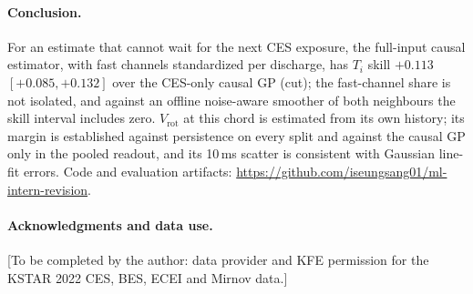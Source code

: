 \documentclass[10pt,twocolumn,letterpaper]{article}
\newcommand{\Ti}{\ensuremath{T_i}}
\newcommand{\Vrot}{\ensuremath{V_\mathrm{rot}}}
\begin{document}
\paragraph{Conclusion.} For an estimate that cannot wait for the next CES exposure, the
full-input causal estimator, with fast channels standardized per discharge, has \Ti{} skill
$+0.113$ $[+0.085, +0.132]$ over the CES-only causal GP (cut); the fast-channel share is not isolated, and against an
offline noise-aware smoother of both neighbours the skill interval includes zero.
\Vrot{} at this chord is estimated from its own history; its margin is established
against persistence on every split and against the causal GP only in the pooled
readout, and its 10\,ms scatter is consistent with Gaussian line-fit errors. Code and evaluation artifacts:
\url{https://github.com/iseungsang01/ml-intern-revision}.

\paragraph{Acknowledgments and data use.} [To be completed by the author: data
provider and KFE permission for the KSTAR 2022 CES, BES, ECEI and Mirnov data.]

{\small


}
\end{document}
